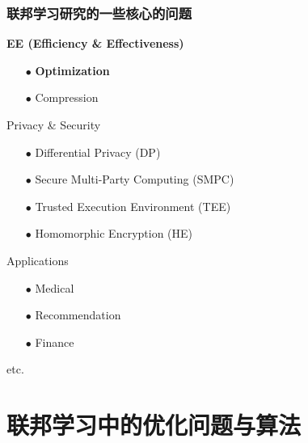 \begin{frame}
\frametitle{联邦学习研究的一些核心的问题}

\begin{itemize}
    \item {\Large\bfseries EE (Efficiency \& Effectiveness)}
    \begin{itemize}
        \item[$\bullet$] {\large\bfseries Optimization}
        \vspace{0.5em}
        \item[$\bullet$] Compression
        \pause
        { \footnotesize
        }
    \end{itemize}
    \vspace{0.6em}
    { \footnotesize
    \item Privacy \& Security
    \begin{itemize}
        \item[$\bullet$] Differential Privacy (DP)
        \item[$\bullet$] Secure Multi-Party Computing (SMPC)
        \item[$\bullet$] Trusted Execution Environment (TEE)
        \item[$\bullet$] Homomorphic Encryption (HE)
    \end{itemize}
    \item Applications
    \begin{itemize}
        \item[$\bullet$] Medical
        \item[$\bullet$] Recommendation
        \item[$\bullet$] Finance
    \end{itemize}
    \item etc.
    }
\end{itemize}

\end{frame}


\section[Optim in FL]{联邦学习中的优化问题与算法}


